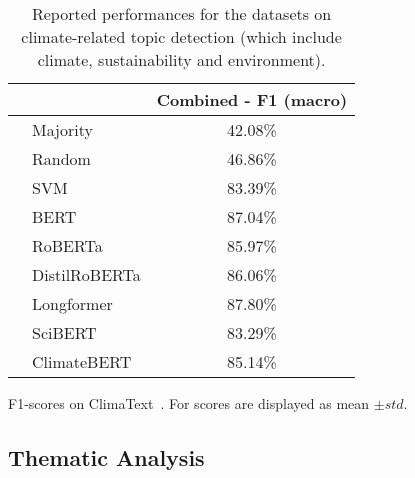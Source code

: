 \begin{table*}[ht]
\begin{subtable}[t]{0.62\textwidth}
{\begin{tabular}{p{3.1cm}p{2cm}ccc}
        & & \multicolumn{3}{c}{\textbf{Combined} - F1 (macro)} \\
        \midrule
        \citet{spokoyny2023answering} & Majority & \multicolumn{3}{c}{42.08\%} \\
        \citet{spokoyny2023answering} & Random & \multicolumn{3}{c}{46.86\%} \\
        \citet{spokoyny2023answering} & SVM & \multicolumn{3}{c}{83.39\%} \\
        \citet{spokoyny2023answering} & BERT & \multicolumn{3}{c}{87.04\%} \\
        \citet{spokoyny2023answering} & RoBERTa & \multicolumn{3}{c}{85.97\%} \\
        \citet{spokoyny2023answering} & DistilRoBERTa & \multicolumn{3}{c}{86.06\%} \\
        \citet{spokoyny2023answering} & Longformer & \multicolumn{3}{c}{87.80\%} \\
        \citet{spokoyny2023answering} & SciBERT & \multicolumn{3}{c}{83.29\%} \\
        \citet{spokoyny2023answering} & ClimateBERT & \multicolumn{3}{c}{85.14\%} \\
        \bottomrule
    \end{tabular}
    }
    \caption{F1-scores on ClimaText~\cite{varini_climatext_2020}. For \citet{varini_climatext_2020} scores are displayed as mean $\pm std$.}
    \label{tab:perf_table_climatext}
    \end{subtable}
    \caption{Reported performances for the datasets on climate-related topic detection (which include climate, sustainability and environment).}
    \label{tab:reported perf climate}
\end{table*}  

\newpage

\subsection{Thematic Analysis}
\label{sec:appendix subtopic}

